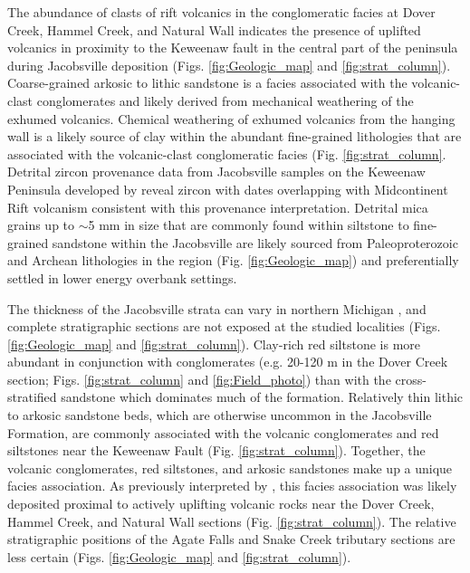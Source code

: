 \documentclass[draft]{agujournal2019}
\begin{document}
The abundance of clasts of rift volcanics in the conglomeratic facies at Dover Creek, Hammel Creek, and Natural Wall indicates the presence of uplifted volcanics in proximity to the Keweenaw fault in the central part of the peninsula during Jacobsville deposition (Figs. \ref{fig:Geologic_map} and \ref{fig:strat_column}). Coarse-grained arkosic to lithic sandstone is a facies associated with the volcanic-clast conglomerates and likely derived from mechanical weathering of the exhumed volcanics. Chemical weathering of exhumed volcanics from the hanging wall is a likely source of clay within the abundant fine-grained lithologies that are associated with the volcanic-clast conglomeratic facies (Fig. \ref{fig:strat_column}. Detrital zircon provenance data from Jacobsville samples on the Keweenaw Peninsula developed by  reveal zircon with dates overlapping with Midcontinent Rift volcanism consistent with this provenance interpretation.  Detrital mica grains up to $\sim$5 mm in size that are commonly found within siltstone to fine-grained sandstone within the Jacobsville are likely sourced from Paleoproterozoic and Archean lithologies in the region (Fig. \ref{fig:Geologic_map}) and preferentially settled in lower energy overbank settings.

The thickness of the Jacobsville strata can vary in northern Michigan \cite{Hamblin1958a, Kalliokoski1982a}, and complete stratigraphic sections are not exposed at the studied localities (Figs. \ref{fig:Geologic_map} and \ref{fig:strat_column}). Clay-rich red siltstone is more abundant in conjunction with conglomerates (e.g. 20-120 m in the Dover Creek section; Figs. \ref{fig:strat_column} and \ref{fig:Field_photo}) than with the cross-stratified sandstone which dominates much of the formation. Relatively thin lithic to arkosic sandstone beds, which are otherwise uncommon in the Jacobsville Formation, are commonly associated with the volcanic conglomerates and red siltstones near the Keweenaw Fault (Fig. \ref{fig:strat_column}). Together, the volcanic conglomerates, red siltstones, and arkosic sandstones make up a unique facies association. As previously interpreted by , this facies association was likely deposited proximal to actively uplifting volcanic rocks near the Dover Creek, Hammel Creek, and Natural Wall sections (Fig. \ref{fig:strat_column}). The relative stratigraphic positions of the Agate Falls and Snake Creek tributary sections are less certain (Figs. \ref{fig:Geologic_map} and \ref{fig:strat_column}).
\end{document}
